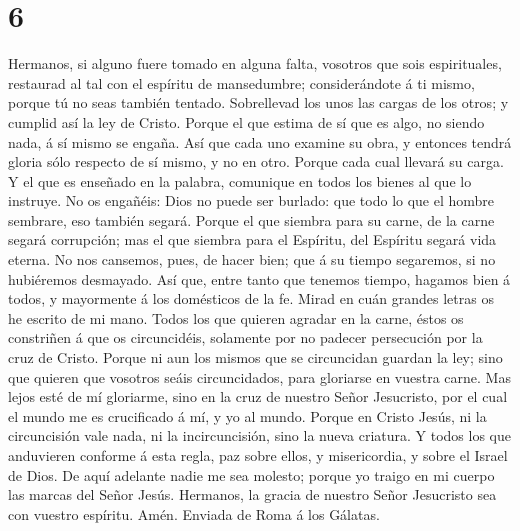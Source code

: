 \hypertarget{section-5}{%
\section{6}\label{section-5}}

 Hermanos, si alguno fuere tomado en alguna falta, vosotros
que sois espirituales, restaurad al tal con el espíritu de mansedumbre;
considerándote á ti mismo, porque tú no seas también tentado.
 Sobrellevad los unos las cargas de los otros; y cumplid así
la ley de Cristo.  Porque el que estima de sí que es algo,
no siendo nada, á sí mismo se engaña.  Así que cada uno
examine su obra, y entonces tendrá gloria sólo respecto de sí mismo, y
no en otro.  Porque cada cual llevará su carga. 
Y el que es enseñado en la palabra, comunique en todos los bienes al que
lo instruye.  No os engañéis: Dios no puede ser burlado: que
todo lo que el hombre sembrare, eso también segará.  Porque
el que siembra para su carne, de la carne segará corrupción; mas el que
siembra para el Espíritu, del Espíritu segará vida eterna. 
No nos cansemos, pues, de hacer bien; que á su tiempo segaremos, si no
hubiéremos desmayado.  Así que, entre tanto que tenemos
tiempo, hagamos bien á todos, y mayormente á los domésticos de la fe.
 Mirad en cuán grandes letras os he escrito de mi mano.
 Todos los que quieren agradar en la carne, éstos os
constriñen á que os circuncidéis, solamente por no padecer persecución
por la cruz de Cristo.  Porque ni aun los mismos que se
circuncidan guardan la ley; sino que quieren que vosotros seáis
circuncidados, para gloriarse en vuestra carne.  Mas lejos
esté de mí gloriarme, sino en la cruz de nuestro Señor Jesucristo, por
el cual el mundo me es crucificado á mí, y yo al mundo. 
Porque en Cristo Jesús, ni la circuncisión vale nada, ni la
incircuncisión, sino la nueva criatura.  Y todos los que
anduvieren conforme á esta regla, paz sobre ellos, y misericordia, y
sobre el Israel de Dios.  De aquí adelante nadie me sea
molesto; porque yo traigo en mi cuerpo las marcas del Señor Jesús.
 Hermanos, la gracia de nuestro Señor Jesucristo sea con
vuestro espíritu. Amén. Enviada de Roma á los Gálatas.

